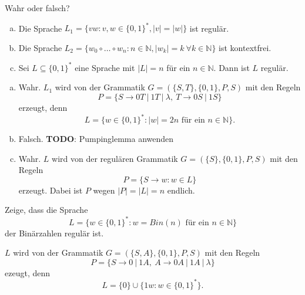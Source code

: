 \documentclass[german,headsepline]{scrartcl}
\theoremstyle{definition}
\begin{document}
	\begin{question} %
		Wahr oder falsch?
		\begin{enumerate}[(a)]
			\item Die Sprache $L_1=\{vw\colon v,w\in\{0,1\}^*,\vert v\vert=\vert w\vert\}$ ist regulär.
			\item Die Sprache $L_2=\{w_0\circ\ldots\circ w_n\colon n\in\mathbb{N},\vert w_k\vert=k~\forall k\in\mathbb{N}\}$ ist kontextfrei.
			\item Sei $L\subseteq\{0,1\}^*$ eine Sprache mit $\vert L\vert=n$ für ein $n\in\mathbb{N}$. Dann ist $L$ regulär.
		\end{enumerate}
	\end{question}
	\begin{solution}
		\begin{enumerate}[(a)]
			\item Wahr. $L_1$ wird von der Grammatik $G=(\{S,T\},\{0,1\},P,S)$ mit den Regeln
				\[P=\{S\rightarrow0T~|~1T~|~\lambda,~T\rightarrow0S~|~1S\}\]
				erzeugt, denn
				\[L=\{w\in\{0,1\}^*\colon\vert w\vert=2n\text{ für ein }n\in\mathbb{N}\}.\]
			\item Falsch. \textbf{TODO}: Pumpinglemma anwenden
			\item Wahr. $L$ wird von der regulären Grammatik $G=(\{S\},\{0,1\},P,S)$ mit den Regeln
				\[P=\{S\to w\colon w\in L\}\]
				erzeugt. Dabei ist $P$ wegen $\vert P\vert=\vert L\vert=n$ endlich.
		\end{enumerate}
	\end{solution}
	
	\begin{question}
		Zeige, dass die Sprache
		\[L=\{w\in\{0,1\}^*\colon w=Bin(n)\text{ für ein }n\in\mathbb{N}\}\]
		der Binärzahlen regulär ist.
	\end{question}
	\begin{solution}
		$L$ wird von der Grammatik $G=(\{S,A\},\{0,1\},P,S)$ mit den Regeln
		\[P=\{S\rightarrow0~|~1A,~A\rightarrow0A~|~1A~|~\lambda\}\]
		ezeugt, denn
		\[L=\{0\}\cup\{1w\colon w\in\{0,1\}^*\}\text{.}\]
	\end{solution}
	
\end{document}
